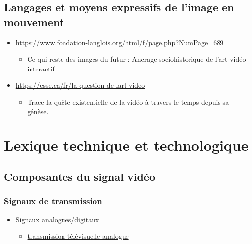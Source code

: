 \documentclass[
]{book}
\providecommand{\tightlist}{%
  \setlength{\itemsep}{0pt}\setlength{\parskip}{0pt}}
\begin{document}
\hypertarget{evolution_historique_language}{%
\section{Langages et moyens expressifs de l'image en mouvement}\label{evolution_historique_language}}

\begin{itemize}
\tightlist
\item
  \url{https://www.fondation-langlois.org/html/f/page.php?NumPage=689}

  \begin{itemize}
  \tightlist
  \item
    Ce qui reste des images du futur : Ancrage sociohistorique de l'art vidéo interactif\\
  \end{itemize}
\item
  \url{https://esse.ca/fr/la-question-de-lart-video}

  \begin{itemize}
  \tightlist
  \item
    Trace la quête existentielle de la vidéo à travers le temps depuis sa génèse.
  \end{itemize}
\end{itemize}

\hypertarget{lexique}{%
\chapter{Lexique technique et technologique}\label{lexique}}

\hypertarget{lexique_composantes}{%
\section{Composantes du signal vidéo}\label{lexique_composantes}}

\hypertarget{signaux-de-transmission}{%
\subsection{Signaux de transmission}\label{signaux-de-transmission}}

\begin{itemize}
\tightlist
\item
  \href{https://en.wikipedia.org/wiki/Video\#Analog_video}{Signaux analogues/digitaux}

  \begin{itemize}
  \tightlist
  \item
    \href{https://en.wikipedia.org/wiki/Analog_television}{transmission télévisuelle analogue}
  \end{itemize}
\end{itemize}
\end{document}
